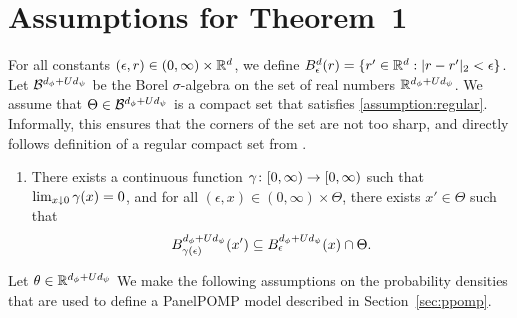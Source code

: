 \section{Assumptions for Theorem~1}\label{sec:assumptions}

For all constants $(\epsilon, r) \in (0, \infty) \times \mathbb{R}^d$, we define $B^d_\epsilon(r) = \{r' \in \mathbb{R}^d: \vert r - r'\vert_2 < \epsilon\}$. 
Let $\mathcal{B}^{d_\phi+Ud_\psi}$ be the Borel $\sigma$-algebra on the set of real numbers $\mathbb{R}^{d_\phi+Ud_\psi}$.
We assume that $\Theta \in \mathcal{B}^{d_\phi+Ud_\psi}$ is a compact set that satisfies \ref{assumption:regular}.
Informally, this ensures that the corners of the set are not too sharp, and directly follows definition of a regular compact set from \citet{chen24}.
\begin{enumerate}[label=(A\arabic*), ref=(A\arabic*)]
  \item \label{assumption:regular} There exists a continuous function $\gamma\colon [0, \infty) \to [0, \infty)$ such that $\lim_{x\downarrow 0} \gamma(x) = 0$, and for all $(\epsilon, x) \in (0,\infty) \times \Theta$, there exists $x' \in \Theta$ such that
$$
B^{d_\phi+Ud_\psi}_{\gamma(\epsilon)}(x') \subseteq B^{d_\phi+Ud_\psi}_{\epsilon}(x) \cap \Theta.
$$
\end{enumerate}
Let $\theta \in \mathbb{R}^{d_\phi+Ud_\psi}$
We make the following assumptions on the probability densities that are used to define a PanelPOMP model described in Section~\ref{sec:ppomp}.
